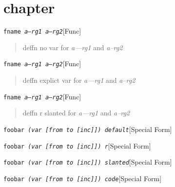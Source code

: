 \documentclass{book}
\begin{document}
\label{anchor:Top}%
\chapter{chapter}
\label{anchor:chapter}%

\noindent\texttt{fname \EmbracOn{}\textnormal{\textsl{a---rg1 a--rg2}}\EmbracOff{}}\hfill[Func]



%
\begin{quote}
deffn no var for \textsl{a---rg1} and \textsl{a--rg2}
\end{quote}

\noindent\texttt{fname \EmbracOn{}\textnormal{\textsl{\textsl{a---rg1} \textsl{a--rg2}}}\EmbracOff{}}\hfill[Func]



%
\begin{quote}
deffn explict var for \textsl{a---rg1} and \textsl{a--rg2}
\end{quote}

\noindent\texttt{fname \EmbracOn{}\textnormal{\textsl{\EmbracOff{}\textnormal{\textsl{a---rg1}}\EmbracOn{} \EmbracOff{}\textnormal{\textsl{a--rg2}}\EmbracOn{}}}\EmbracOff{}}\hfill[Func]



%
\begin{quote}
deffn r slanted for \textsl{a---rg1} and \textsl{a--rg2}
\end{quote}

\noindent\texttt{foobar \EmbracOn{}\textnormal{\textsl{(var [from to [inc{]}{]}) default}}\EmbracOff{}}\hfill[Special Form]



%
\noindent\texttt{foobar \EmbracOn{}\textnormal{\textsl{(var \EmbracOff{}\textnormal{[}\EmbracOn{}from to \EmbracOff{}\textnormal{[}\EmbracOn{}inc\EmbracOff{}\textnormal{{]}{]}}\EmbracOn{}) r}}\EmbracOff{}}\hfill[Special Form]



%
\noindent\texttt{foobar \EmbracOn{}\textnormal{\textsl{(var \textsl{[}from to \textsl{[}inc\textsl{{]}{]}}) slanted}}\EmbracOff{}}\hfill[Special Form]



%
\noindent\texttt{foobar \EmbracOn{}\textnormal{\textsl{(var \texttt{[}from to \texttt{[}inc\texttt{{]}{]}}) code}}\EmbracOff{}}\hfill[Special Form]
\end{document}
